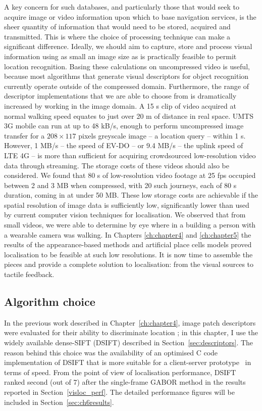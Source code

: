 A key concern for such databases, and particularly those that would seek to acquire image or video information upon which to base navigation services, is the sheer quantity of information that would need to be stored, acquired and transmitted.  This is where the choice of processing technique can make a significant difference.  Ideally, we should aim to capture, store and process visual information using as small an image size as is practically feasible to permit location recognition.  Basing these calculations on uncompressed video is useful, because most algorithms that generate visual descriptors for object recognition currently operate outside of the compressed domain. Furthermore, the range of descriptor implementations that we are able to choose from is dramatically increased by working in the image domain.  A 15 s clip of video acquired at normal walking speed equates to just over 20 m of distance in real space. UMTS 3G mobile can run at up to 48 kB/s, enough to perform uncompressed image transfer for a $208 \times 117$ pixels greyscale image -- a location query -- within 1 s.  However, 1 MB/s -- the speed of EV-DO \citep{bhushan2006cdma2000} -- or 9.4 MB/s -- the uplink speed of LTE 4G --  is more than sufficient for acquiring crowdsourced low-resolution video data through streaming.  The storage costs of these videos should also be considered.  We found that 80 s of low-resolution video footage at 25 fps occupied between 2 and 3 MB when compressed, with 20 such journeys, each of 80 s duration, coming in at under 50 MB.  These low storage costs are achievable if the spatial resolution of image data is sufficiently low, significantly lower than used by current computer vision techniques for localisation. We observed that from small videos, we were able to determine by eye where in a building a person with a wearable camera was walking. In Chapters \ref{ch:chapter4} and \ref{ch:chapter5} the results of the appearance-based methods and artificial place cells models proved localisation to be feasible at such low resolutions.  It is now time to assemble the pieces and provide a complete solution to localisation: from the visual sources to tactile feedback.

\subsection{Algorithm choice} In the previous work described in Chapter~\ref{ch:chapter4}, image patch descriptors were evaluated for their ability to discriminate location \citep{Rivera-Rubio2015PRL}; in this chapter, I use the widely available dense-SIFT (DSIFT) described in Section~\ref{sec:descriptors}. The reason behind this choice was the availability of an optimised C code implementation of DSIFT that is more suitable for a client-server prototype~\cite{Vedaldi2008} in terms of speed. From the point of view of localisation performance, DSIFT ranked second (out of 7) after the single-frame GABOR method in the results reported in Section~\ref{visloc_perf}. The detailed performance figures will be included in Section~\ref{sec:ch6results}.

